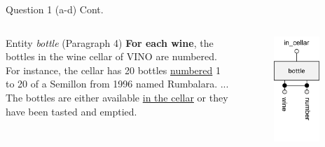 \begin{frame}[fragile]{Question 1 (a-d) Cont.}
\begin{columns}
	\begin{exampleblock}{Entity \textit{bottle} (Paragraph 4)}
		\textbf{For each wine}, the bottles in the wine cellar of VINO are numbered. For instance, the cellar has 20 bottles \underline{numbered} 1 to 20 of a Semillon from 1996 named Rumbalara. ... The bottles are either available \underline{in the cellar} or they have been tasted and emptied.
	\end{exampleblock}
	\begin{figure}
		\includegraphics[width=0.8\textwidth, trim=0 2cm 0 0.3cm, clip]{t4/images/bottle_entity_1fk.png}

\end{figure}
\end{columns}
\end{frame}
